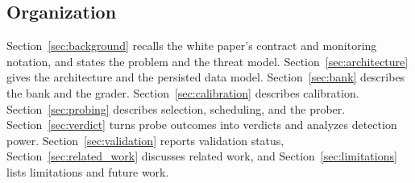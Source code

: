 \subsection{Organization}

Section~\ref{sec:background} recalls the white paper's contract and monitoring
notation, and states the problem and the threat model.
Section~\ref{sec:architecture} gives the architecture and the persisted data
model. Section~\ref{sec:bank} describes the bank and the grader.
Section~\ref{sec:calibration} describes calibration.
Section~\ref{sec:probing} describes selection, scheduling, and the prober.
Section~\ref{sec:verdict} turns probe outcomes into verdicts and analyzes
detection power. Section~\ref{sec:validation} reports validation status,
Section~\ref{sec:related_work} discusses related work, and
Section~\ref{sec:limitations} lists limitations and future work.
